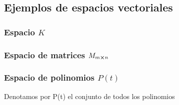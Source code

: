 \subsection*{Ejemplos de espacios vectoriales}
\subsubsection*{Espacio $K$}
\subsubsection*{Espacio de matrices $M_{m\cross n}$}
\subsubsection*{Espacio de polinomios $P(t)$}
Denotamos por P(t) el conjunto de todos los polinomios
